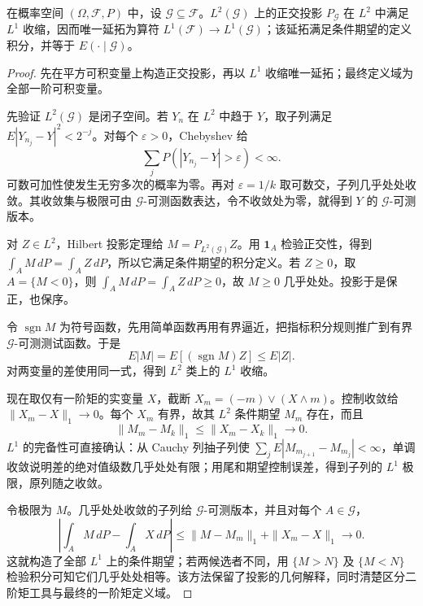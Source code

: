 \begin{lemma}
在概率空间 $(\Omega,\mathcal F,P)$ 中，设 $\mathcal G\subseteq\mathcal F$。$L^2(\mathcal G)$ 上的正交投影 $P_{\mathcal G}$ 在 $L^2$ 中满足 $L^1$ 收缩，因而唯一延拓为算符 $L^1(\mathcal F)\to L^1(\mathcal G)$；该延拓满足条件期望的定义积分，并等于 $E(\cdot\mid\mathcal G)$。
\end{lemma}
\begin{proof}
先在平方可积变量上构造正交投影，再以 $L^1$ 收缩唯一延拓；最终定义域为全部一阶可积变量。

先验证 $L^2(\mathcal G)$ 是闭子空间。若 $Y_n$ 在 $L^2$ 中趋于 $Y$，取子列满足 $E|Y_{n_j}-Y|^2<2^{-j}$。对每个 $\varepsilon>0$，Chebyshev 给
\[
 \sum_jP(|Y_{n_j}-Y|>\varepsilon)<\infty.
\]
可数可加性使发生无穷多次的概率为零。再对 $\varepsilon=1/k$ 取可数交，子列几乎处处收敛。其收敛集与极限可由 $\mathcal G$-可测函数表达，令不收敛处为零，就得到 $Y$ 的 $\mathcal G$-可测版本。

对 $Z\in L^2$，Hilbert 投影定理给 $M=P_{L^2(\mathcal G)}Z$。用 $\mathbf1_A$ 检验正交性，得到 $\int_AM\,dP=\int_AZ\,dP$，所以它满足条件期望的积分定义。若 $Z\ge0$，取 $A=\{M<0\}$，则 $\int_AM\,dP=\int_AZ\,dP\ge0$，故 $M\ge0$ 几乎处处。投影于是保正，也保序。

令 $\operatorname{sgn}M$ 为符号函数，先用简单函数再用有界逼近，把指标积分规则推广到有界 $\mathcal G$-可测测试函数。于是
\[
 E|M|=E[(\operatorname{sgn}M)Z]\le E|Z|.
\]
对两变量的差使用同一式，得到 $L^2$ 类上的 $L^1$ 收缩。

现在取仅有一阶矩的实变量 $X$，截断 $X_m=(-m)\vee(X\wedge m)$。控制收敛给 $\|X_m-X\|_1\to0$。每个 $X_m$ 有界，故其 $L^2$ 条件期望 $M_m$ 存在，而且
\[
 \|M_m-M_k\|_1\le\|X_m-X_k\|_1\longrightarrow0.
\]
$L^1$ 的完备性可直接确认：从 Cauchy 列抽子列使 $\sum_jE|M_{m_{j+1}}-M_{m_j}|<\infty$，单调收敛说明差的绝对值级数几乎处处有限；用尾和期望控制误差，得到子列的 $L^1$ 极限，原列随之收敛。

令极限为 $M$。几乎处处收敛的子列给 $\mathcal G$-可测版本，并且对每个 $A\in\mathcal G$，
\[
 \left|\int_AM\,dP-\int_AX\,dP\right|
 \le\|M-M_m\|_1+\|X_m-X\|_1\longrightarrow0.
\]
这就构造了全部 $L^1$ 上的条件期望；若两候选者不同，用 $\{M>N\}$ 及 $\{M<N\}$ 检验积分可知它们几乎处处相等。该方法保留了投影的几何解释，同时清楚区分二阶矩工具与最终的一阶矩定义域。
\end{proof}


